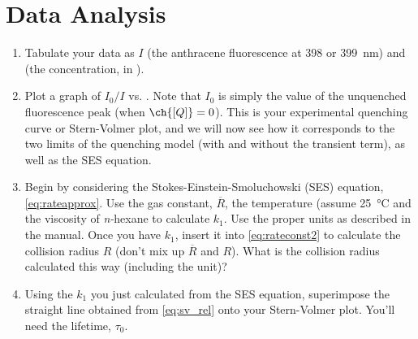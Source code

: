 \documentclass[nobib,nofonts,nols,nohyper]{tufte-handout}
\begin{document}
\section{Data Analysis} %
\label{sec:data_analysis}
\begin{enumerate}
	\item Tabulate your data as \( I \) (the anthracene fluorescence at \num{398} or \qty{399}{\nm}) and \ch{[Q]} (the  concentration, in \unit{\Molar}).
	\item Plot a graph of  \( I_0/I \)  vs. \ch{[Q]}. 
	Note that \( I_0 \) is simply the value of the unquenched fluorescence peak (when \( \ch{[Q]} = 0 \)). 
	This is your experimental quenching curve or Stern-Volmer plot, and we will now see how it corresponds to the two limits of the quenching model (with and without the transient term), as well as the SES equation.
	\item Begin by considering the Stokes-Einstein-Smoluchowski (SES) equation, \cref{eq:rateapprox}. 
	Use the gas constant, \( \overline{R} \), the temperature (assume \qty{25}{\celsius} and the viscosity of \emph{n-}hexane to calculate \( k_1 \). 
	Use the proper units as described in the manual. 
  Once you have \( k_1 \), insert it into \cref{eq:rateconst2} to calculate the collision radius \( R \) (don’t mix up \( \overline{R} \) and \( R \)). 
	What is the collision radius calculated this way (including the unit)?
	\item Using the \( k_1 \) you just calculated from the SES equation, superimpose the straight line obtained from \cref{eq:sv_rel} onto your Stern-Volmer plot. You’ll need the lifetime, \( \tau_0 \).\sidenote{
}
\end{enumerate}
\end{document}
